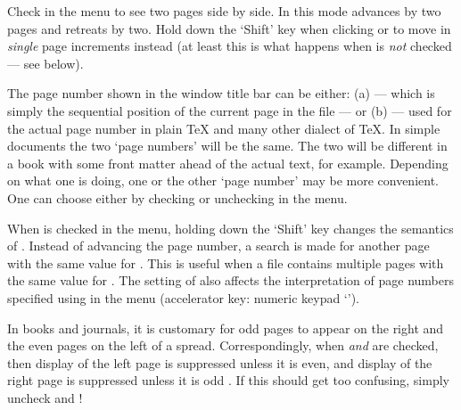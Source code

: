 
Check  in the  menu to see two pages
side by side.   
In this mode  advances by two pages and 
retreats by two.
Hold down the `Shift' key when clicking  or 
to move in {\it single\/} page increments instead
(at least this is what happens when  is {\it not\/}
checked --- see below). 

The page number shown in the window title bar can be either: 
(a)  ---
which is simply the sequential position of the current page in the
{\DVI} file --- %
or (b)  ---
used for the actual page number in plain {\TeX}
and many other dialect of {\TeX}.
In simple documents the two `page numbers' will be the same.
The two will be different in a book with some
front matter ahead of the actual text, for example.
Depending on what one is doing, one or the other `page number'
may be more convenient.
One can choose either by checking or unchecking 
 in the  menu. 

When  is checked in the  menu, holding
down the `Shift' key changes the semantics of . 
Instead of advancing the page number, a search is made for another page
with the same value for .  
This is useful when a file contains multiple pages with the same value
for .
%
The setting of  also affects the interpretation of page
numbers specified using  in the  menu 
(accelerator key: numeric keypad `\type{*}').

In books and journals, it is customary for odd pages to appear on the
right and the even pages on the left of a spread.
Correspondingly, when  %
{\it and\/} 
are checked, then display of the left page is suppressed unless it
is even, and display of the right page is suppressed unless it is odd%
.
If this should get too confusing, simply uncheck 
and !

